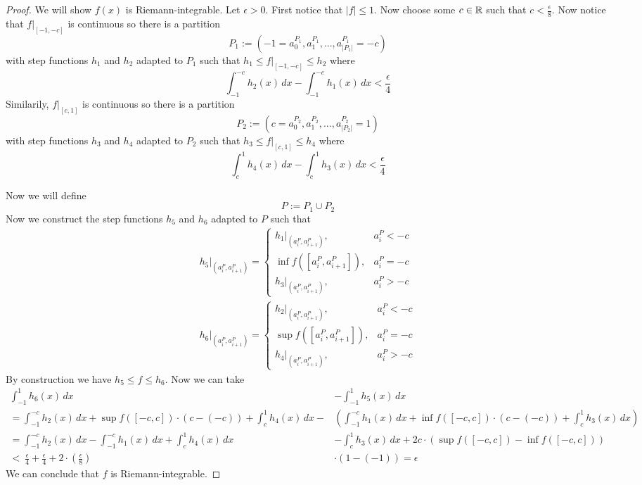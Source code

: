 \documentclass{exam}
\begin{document}
\begin{proof}
  We will show $f(x)$ is Riemann-integrable. Let $\epsilon >0$. 
  First notice that $|f| \leq 1$. Now choose some $c\in\mathbb{R}$ such that 
  $c < \frac{\epsilon}{8}$. Now notice that $f|_{[-1,-c]}$ is continuous
  so there is a partition $$P_1 :=( -1 =a_0^{P_1}, a_1^{P_1},
  ..., a_{|P_1|}^{P_1}= -c)$$ with step functions $h_1$ and $h_2$ adapted
  to $P_1$ such that $h_1 \leq f|_{[-1,-c]} \leq h_2$ where 
  $$\int_{-1}^{-c}h_2(x)\, dx - \int_{-1}^{-c}h_1(x)\, dx < 
  \frac{\epsilon}{4}$$ Similarily, $f|_{[c,1]}$ is continuous so there is
  a partition $$P_2 := (c = a_0^{P_2}, a_1^{P_2}, ..., a_{|P_2|}^{P_2}= 1)$$
  with step functions $h_3$ and $h_4$ adapted to $P_2$ such that 
  $h_3 \leq f|_{[c,1]} \leq h_4$ where $$\int_{c}^{1}h_4(x)\, dx -
  \int_{c}^{1}h_3(x)\, dx < \frac{\epsilon}{4}$$
  
  Now we will define $$P := P_1\cup P_2$$ Now we construct the step 
  functions $h_5$ and $h_6$ adapted to $P$ such that 
  \begin{align*} 
    h_5\bigg|_{(a_i^P, a_{i+1}^P)} = 
    \begin{cases} 
      h_1|_{(a_i^P, a_{i+1}^P)}, & a_i^P < -c \\ 
      \inf f([a_i^P, a_{i+1}^P]), & a_i^P= -c  \\ 
      h_3|_{(a_i^P, a_{i+1}^P)}, & a_i^P > -c 
    \end{cases}
    \\ h_6\bigg|_{(a_i^P, a_{i+1}^P)} = 
    \begin{cases}
      h_2|_{(a_i^P, a_{i+1}^P)}, & a_i^P < -c \\
      \sup f([a_i^P, a_{i+1}^P]), & a_i^P = -c  \\
      h_4|_{(a_i^P, a_{i+1}^P)}, & a_i^P > -c 
    \end{cases}
  \end{align*} 
  By construction we have $h_5 \leq f \leq h_6$. Now we can take 
  \begin{align*}
    \int_{-1}^{1}h_6(x)\, dx &- \int_{-1}^{1}h_5(x)\, dx \\
    = \int_{-1}^{-c}h_2(x)\, dx + \sup f([-c, c])\cdot (c-(-c)) +
    \int_{c}^{1}h_4(x)\, dx -& \left(\int_{-1}^{-c}h_1(x)\, dx +
    \inf f([-c, c])\cdot(c-(-c)) +\int_{c}^{1}h_3(x)\, dx\right) \\
    = \int_{-1}^{-c}h_2(x)\, dx - \int_{-1}^{-c}h_1(x)\, dx 
    + \int_{c}^{1}h_4(x)\, dx &- \int_{c}^{1}h_3(x)\, dx + 2c \cdot
    (\sup f([-c, c]) - \inf f([-c, c])) \\ < \ \frac{\epsilon}{4} +
    \frac{\epsilon}{4} + 2\cdot(\frac{\epsilon}{8}) &\cdot 
    (1 - (-1)) = \epsilon
  \end{align*}
  We can conclude that $f$ is Riemann-integrable.
\end{proof}
\end{document}
